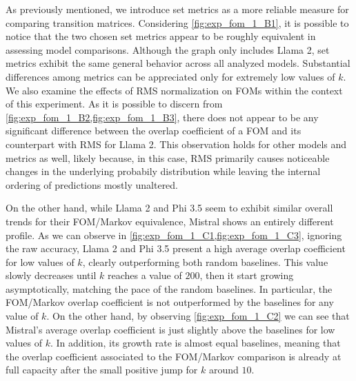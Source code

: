 As previously mentioned, we introduce set metrics as a more reliable measure for comparing transition matrices.
Considering \cref{fig:exp_fom_1_B1}, it is possible to notice that the two chosen set metrics appear to be roughly equivalent in assessing model comparisons.
Although the graph only includes Llama 2, set metrics exhibit the same general behavior across all analyzed models.
Substantial differences among metrics can be appreciated only for extremely low values of $k$.
We also examine the effects of RMS normalization on FOMs within the context of this experiment.
As it is possible to discern from \cref{fig:exp_fom_1_B2,fig:exp_fom_1_B3}, there does not appear to be any significant difference between the overlap coefficient of a FOM and its counterpart with RMS for Llama 2.
This observation holds for other models and metrics as well, likely because, in this case, RMS primarily causes noticeable changes in the underlying probabily distribution while leaving the internal ordering of predictions mostly unaltered.

\begin{figure}[t!]
    \centering
    \quad
    \caption{}
    \label{fig:exp_fom_1_B}
\end{figure}

On the other hand,  while Llama 2 and Phi 3.5 seem to exhibit similar overall trends for their FOM/Markov equivalence, Mistral shows an entirely different profile.
As we can observe in \cref{fig:exp_fom_1_C1,fig:exp_fom_1_C3}, ignoring the raw accuracy, Llama 2 and Phi 3.5 present a high average overlap coefficient for low values of $k$, clearly outperforming both random baselines.
This value slowly decreases until $k$ reaches a value  of $200$, then it start growing asymptotically, matching the pace of the random baselines.
In particular, the FOM/Markov overlap coefficient is not outperformed by the baselines for any value of $k$.
On the other hand, by observing \cref{fig:exp_fom_1_C2} we can see that Mistral's average overlap coefficient is just slightly above the baselines for low values of $k$.
In addition, its growth rate is almost equal  baselines, meaning that the overlap coefficient associated to the FOM/Markov comparison is already at full capacity after the small positive jump for $k$ around $10$.

